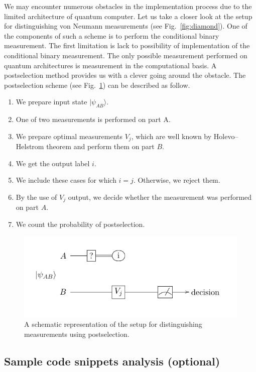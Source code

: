 \documentclass[preprint,12pt, a4paper]{elsarticle}
\newcommand{\ket}[1]{\ensuremath{|#1\rangle}}
\newcommand{\1}{{\rm 1\hspace{-0.9mm}l}}
\begin{document}
We may encounter numerous obstacles in the implementation process due to the limited architecture of quantum computer. 
Let us take a closer look at the setup for distinguishing von Neumann 
measurements (see Fig.~\ref{fig:diamond}). One of the components of such a scheme is to perform the conditional binary measurement. The first limitation is lack to possibility of implementation of the conditional binary measurement. The only possible measurement performed on quantum architectures is measurement in the computational basis. 
A postselection method provides us with a clever going around the obstacle. The postselection  scheme (see Fig.~\ref{postselection})  can be described as follow. 


\begin{enumerate}
	\item We prepare input state $\ket{\psi_{AB}}$.
	\item One of two measurements is performed on part A.
	\item We prepare optimal measurements $V_j$, which are well known by Holevo--Helstrom theorem and perform them on part $B$.
	\item We get the output label $i$.
	\item We include these cases for which $i = j$. Otherwise, we reject them.
	\item By the use of $V_j$ output, we decide whether the measurement was performed on part $A$.
	\item We count the probability of postselection.
\end{enumerate}

\begin{figure}[h!]
	\includegraphics[scale=1.5]{onequbit.pdf}
	\caption{A schematic representation of the setup for distinguishing
		measurements using postselection.}
	\label{postselection}
\end{figure} 


\subsection{Sample code snippets analysis (optional)}
\label{}
\end{document}
